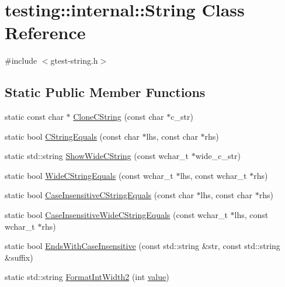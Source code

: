 \hypertarget{classtesting_1_1internal_1_1_string}{}\section{testing\+::internal\+::String Class Reference}
\label{classtesting_1_1internal_1_1_string}


{\ttfamily \#include $<$gtest-\/string.\+h$>$}

\subsection*{Static Public Member Functions}
\begin{DoxyCompactItemize}
\item 
static const char $\ast$ \mbox{\hyperlink{classtesting_1_1internal_1_1_string_a8bce6b1281ae3d2f9061b920aa78aca0}{Clone\+C\+String}} (const char $\ast$c\+\_\+str)
\item 
static bool \mbox{\hyperlink{classtesting_1_1internal_1_1_string_a8bea7b33e7effbd299a0b4a5522ea96e}{C\+String\+Equals}} (const char $\ast$lhs, const char $\ast$rhs)
\item 
static std\+::string \mbox{\hyperlink{classtesting_1_1internal_1_1_string_aaf7e376ff580677ea4954d5913d5b917}{Show\+Wide\+C\+String}} (const wchar\+\_\+t $\ast$wide\+\_\+c\+\_\+str)
\item 
static bool \mbox{\hyperlink{classtesting_1_1internal_1_1_string_ab0373bf6e96453d6ca0de2e68df13d3a}{Wide\+C\+String\+Equals}} (const wchar\+\_\+t $\ast$lhs, const wchar\+\_\+t $\ast$rhs)
\item 
static bool \mbox{\hyperlink{classtesting_1_1internal_1_1_string_a116ca435d63306927ba19f90a3596787}{Case\+Insensitive\+C\+String\+Equals}} (const char $\ast$lhs, const char $\ast$rhs)
\item 
static bool \mbox{\hyperlink{classtesting_1_1internal_1_1_string_a1f12d1780ca7afbf8975f5d425b9f362}{Case\+Insensitive\+Wide\+C\+String\+Equals}} (const wchar\+\_\+t $\ast$lhs, const wchar\+\_\+t $\ast$rhs)
\item 
static bool \mbox{\hyperlink{classtesting_1_1internal_1_1_string_a968f242b709f8c7c0ed5ecf246553321}{Ends\+With\+Case\+Insensitive}} (const std\+::string \&str, const std\+::string \&suffix)
\item 
static std\+::string \mbox{\hyperlink{classtesting_1_1internal_1_1_string_af50b18d588355871e1982c4043523e0f}{Format\+Int\+Width2}} (int \mbox{\hyperlink{_obj__test_2lib_2googletest-master_2googlemock_2test_2gmock-matchers__test_8cc_a337b8a670efc0b086ad3af163f3121b6}{value}})

\end{DoxyCompactItemize}
